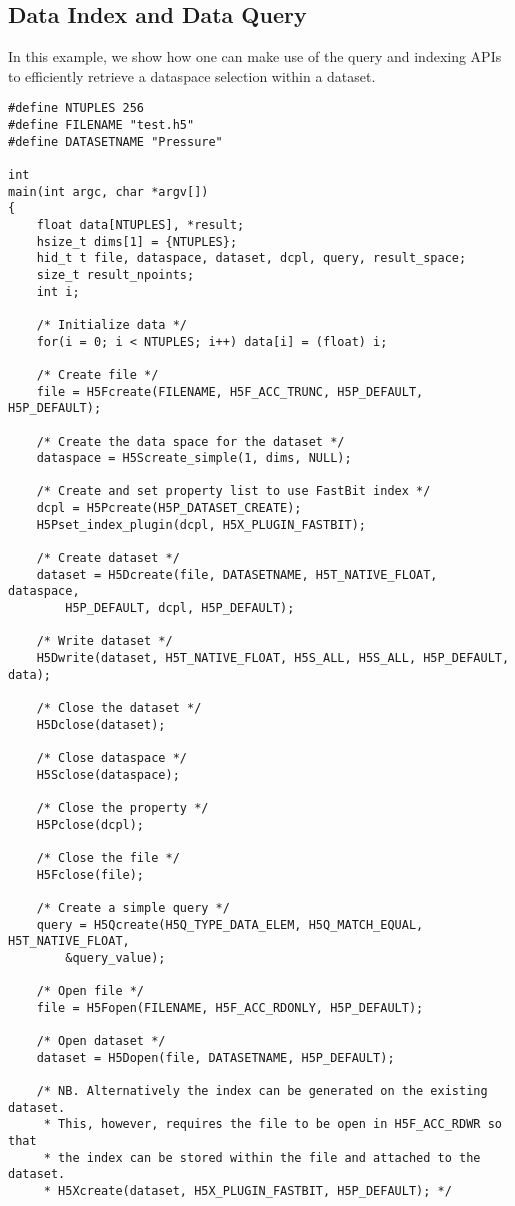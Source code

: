 \subsection{Data Index and Data Query}
In this example, we show how one can make use of the query and
indexing APIs to efficiently retrieve a dataspace selection within a dataset.

{
\begin{lstlisting}
#define NTUPLES 256
#define FILENAME "test.h5"
#define DATASETNAME "Pressure"

int
main(int argc, char *argv[])
{
    float data[NTUPLES], *result;
    hsize_t dims[1] = {NTUPLES};
    hid_t t file, dataspace, dataset, dcpl, query, result_space;
    size_t result_npoints;
    int i;

    /* Initialize data */
    for(i = 0; i < NTUPLES; i++) data[i] = (float) i;

    /* Create file */
    file = H5Fcreate(FILENAME, H5F_ACC_TRUNC, H5P_DEFAULT, H5P_DEFAULT);

    /* Create the data space for the dataset */
    dataspace = H5Screate_simple(1, dims, NULL);

    /* Create and set property list to use FastBit index */
    dcpl = H5Pcreate(H5P_DATASET_CREATE);
    H5Pset_index_plugin(dcpl, H5X_PLUGIN_FASTBIT);

    /* Create dataset */
    dataset = H5Dcreate(file, DATASETNAME, H5T_NATIVE_FLOAT, dataspace,
        H5P_DEFAULT, dcpl, H5P_DEFAULT);

    /* Write dataset */
    H5Dwrite(dataset, H5T_NATIVE_FLOAT, H5S_ALL, H5S_ALL, H5P_DEFAULT, data);

    /* Close the dataset */
    H5Dclose(dataset);

    /* Close dataspace */
    H5Sclose(dataspace);

    /* Close the property */
    H5Pclose(dcpl);

    /* Close the file */
    H5Fclose(file);

    /* Create a simple query */
    query = H5Qcreate(H5Q_TYPE_DATA_ELEM, H5Q_MATCH_EQUAL, H5T_NATIVE_FLOAT,
        &query_value);

    /* Open file */
    file = H5Fopen(FILENAME, H5F_ACC_RDONLY, H5P_DEFAULT);

    /* Open dataset */
    dataset = H5Dopen(file, DATASETNAME, H5P_DEFAULT);

    /* NB. Alternatively the index can be generated on the existing dataset.
     * This, however, requires the file to be open in H5F_ACC_RDWR so that
     * the index can be stored within the file and attached to the dataset.
     * H5Xcreate(dataset, H5X_PLUGIN_FASTBIT, H5P_DEFAULT); */


\end{lstlisting}}
